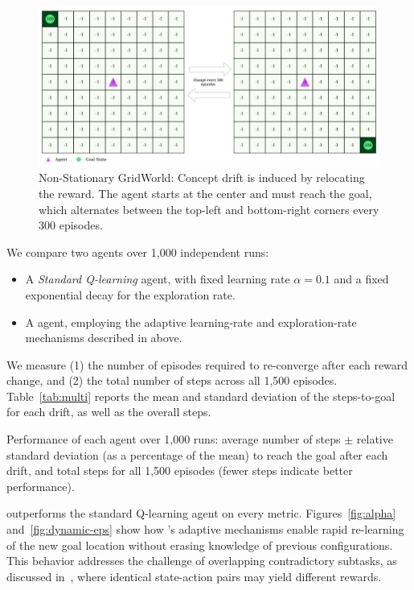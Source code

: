\begin{figure}
    \centering
    \includegraphics[width=\textwidth]{figures/rewards_change.png}
    \caption{Non-Stationary GridWorld: Concept drift is induced by relocating the reward. The agent starts at the center and must reach the goal, which alternates between the top-left and bottom-right corners every 300 episodes.}
    \label{fig:r-change}
\end{figure}

We compare two agents over 1,000 independent runs:  
\begin{itemize}
  \item A \emph{Standard Q-learning} agent, with fixed learning rate $\alpha=0.1$ and a fixed exponential decay for the exploration rate.
  \item A \emph{\adaptiverl} agent, employing the adaptive learning-rate and exploration-rate mechanisms described in above.
\end{itemize}
We measure (1) the number of episodes required to re-converge after each reward change, and (2) the total number of steps across all 1,500 episodes. Table~\ref{tab:multi} reports the mean and standard deviation of the steps-to-goal for each drift, as well as the overall steps.  

\begin{table}
    \centering
    \caption{Performance of each agent over 1,000 runs: average number of steps $\pm$ relative standard deviation (as a percentage of the mean) to reach the goal after each drift, and total steps for all 1,500 episodes (fewer steps indicate better performance).}
    
    \label{tab:multi}
\end{table}

\adaptiverl outperforms the standard Q-learning agent on every metric. Figures~\ref{fig:alpha} and~\ref{fig:dynamic-eps} show how \adaptiverl's adaptive mechanisms enable rapid re-learning of the new goal location without erasing knowledge of previous configurations. This behavior addresses the challenge of overlapping contradictory subtasks, as discussed in~\cite{Bagus2022}, where identical state-action pairs may yield different rewards.

